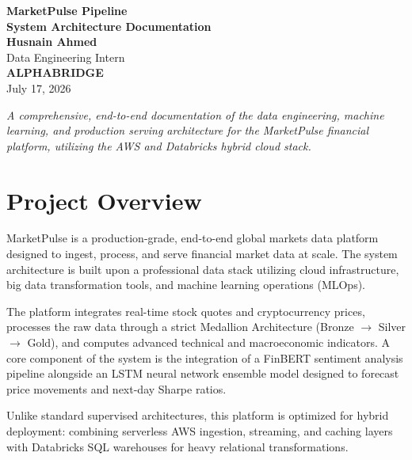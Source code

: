 \documentclass[11pt,a4paper]{article}
\begin{document}
\begin{titlepage}
    \centering
    \vspace*{3cm}
    {\Huge \bfseries MarketPulse Pipeline \\ [0.4cm] System Architecture Documentation} \\
    \vspace{2cm}
    {\Large \bfseries Husnain Ahmed} \\
    {\large Data Engineering Intern} \\
    {\large \bfseries ALPHABRIDGE} \\
    \vspace{2cm}
    {\large July 17, 2026} \\
    \vfill
    \begin{minipage}{0.8\textwidth}
        \centering
        \itshape
        A comprehensive, end-to-end documentation of the data engineering,
        machine learning, and production serving architecture for the MarketPulse financial
        platform, utilizing the AWS and Databricks hybrid cloud stack.
    \end{minipage}
    \vspace*{2cm}
\end{titlepage}

\newpage
\tableofcontents
\newpage

\section{Project Overview}
MarketPulse is a production-grade, end-to-end global markets data platform designed to ingest, process, and serve financial market data at scale. The system architecture is built upon a professional data stack utilizing cloud infrastructure, big data transformation tools, and machine learning operations (MLOps).

The platform integrates real-time stock quotes and cryptocurrency prices, processes the raw data through a strict Medallion Architecture (Bronze $\rightarrow$ Silver $\rightarrow$ Gold), and computes advanced technical and macroeconomic indicators. A core component of the system is the integration of a FinBERT sentiment analysis pipeline alongside an LSTM neural network ensemble model designed to forecast price movements and next-day Sharpe ratios. 

Unlike standard supervised architectures, this platform is optimized for hybrid deployment: combining serverless AWS ingestion, streaming, and caching layers with Databricks SQL warehouses for heavy relational transformations.
\end{document}
